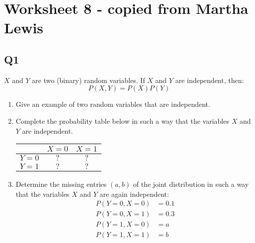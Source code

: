 \documentclass[11pt,a4paper]{scrartcl}
\begin{document}
\section*{Worksheet 8 - copied from Martha Lewis}

\subsection*{Q1}
$X$ and $Y$ are two (binary) random variables. If $X$ and $Y$ are independent, then:
\begin{equation}
    P(X, Y) = P(X)P(Y)
\end{equation}

\begin{enumerate}
\item Give an example of two random variables that are independent.

\item Complete the probability table below in such a way that the variables $X$ and $Y$ are independent.

\begin{center}
    \begin{tabular}{c|cc}
        & $X = 0$ & $X = 1$ \\
        \hline
        $Y = 0$ & $?$ & $? $\\
        $Y = 1$ & $?$ & $? $
    \end{tabular}
\end{center}


\item Determine the missing entries $(a, b)$ of the joint distribution in such a way that the variables $X$ and $Y$ are again independent:
\begin{align*}
    P(Y = 0, X = 0) &= 0.1 \\
    P(Y = 0, X = 1) &= 0.3 \\
    P(Y = 1, X = 0) &= a \\
    P(Y = 1, X = 1) &= b
\end{align*}
\end{enumerate}
\end{document}
